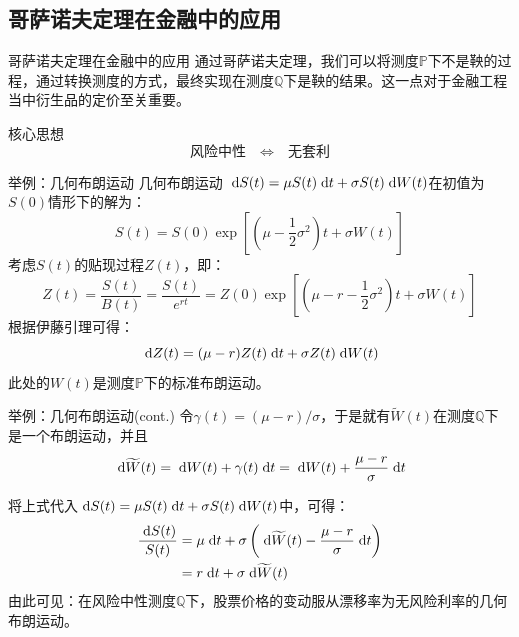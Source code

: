 \documentclass[t]{beamer}
\newcommand{\dif}{{\;\rm d}}
\begin{document}
\subsection{哥萨诺夫定理在金融中的应用}
\begin{frame}{哥萨诺夫定理在金融中的应用}
通过哥萨诺夫定理，我们可以将测度$\mathbb{P}$下不是鞅的过程，通过转换测度的方式，最终实现在测度$\mathbb{Q}$下是鞅的结果。这一点对于金融工程当中衍生品的定价至关重要。
\begin{block}{核心思想}
\[\text{风险中性}\quad \Longleftrightarrow \quad\text{无套利} \]
\end{block}

\end{frame}

\begin{frame}{举例：几何布朗运动}
几何布朗运动
$\dif S(t)=\mu {S(t)}\dif t+\sigma {S(t)}\dif W(t)$在初值为$S(0)$情形下的解为：
\[S(t)=S(0)\exp\left[\left(\mu-\frac{1}{2}\sigma^2 \right)t+\sigma W(t)  \right] \]
考虑$S(t)$的贴现过程$Z(t)$，即：
\[Z(t)=\frac{S(t)}{B(t)}=\frac{S(t)}{e^{rt}}=Z(0)\exp\left[\left(\mu-r-\frac{1}{2}\sigma^2 \right)t+\sigma W(t)  \right]  \]
根据伊藤引理可得：
\[\dif Z(t)=(\mu-r)Z(t)\dif t+\sigma Z(t)\dif W(t)
\]
此处的$W(t)$是测度$\mathbb{P}$下的标准布朗运动。
\end{frame}

\begin{frame}{举例：几何布朗运动(cont.)}
令$\gamma(t)=(\mu-r)/\sigma$，于是就有$\widetilde{W}(t)$在测度$\mathbb{Q}$下是一个布朗运动，并且
\begin{equation*}
\dif \widetilde{W}(t)=\dif W(t)+\gamma(t)\dif t=\dif W(t)+\frac{\mu-r}{\sigma}\dif t
\end{equation*}

将上式代入$\dif S(t)=\mu {S(t)}\dif t+\sigma {S(t)}\dif W(t)$中，可得：
\begin{equation*}
\begin{split}
\frac{\dif S(t)}{S(t)}&=\mu \dif t+\sigma \left(\dif \widetilde{W}(t)-\frac{\mu-r}{\sigma}\dif t \right) \\
&=r\dif t+\sigma\dif \widetilde{W}(t)
\end{split}
\end{equation*}
由此可见：在风险中性测度$\mathbb{Q}$下，股票价格的变动服从{\color{red}漂移率为无风险利率}的几何布朗运动。
\end{frame}
\end{document}
